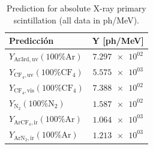 \begin{table}[h!] \centering
\caption{Prediction for absolute X-ray primary scintillation (all data in ph/MeV).}
\label{tab:prediction}
\begin{tabular}{lS}
\toprule
{Predicción} & {Y [ph/MeV]} \\
\midrule
$Y_{\mathrm{Ar3rd,uv}} (100\% \mathrm{Ar})$ & $\num{7.297e+02}$ \\
$Y_{\mathrm{CF_4,uv}} (100\% \mathrm{CF_4})$ & $\num{5.575e+03}$ \\
$Y_{\mathrm{CF_4,vis}} (100\% \mathrm{CF_4})$ & $\num{7.388e+02}$ \\
$Y_{\mathrm{N_2}} (100\% \mathrm{N_2})$ & $\num{1.587e+02}$ \\
$Y_{\mathrm{ArCF_4,ir}} (100\% \mathrm{Ar})$ & $\num{1.064e+03}$ \\
$Y_{\mathrm{ArN_2,ir}} (100\% \mathrm{Ar})$ & $\num{1.213e+03}$ \\
\bottomrule
\end{tabular}
\end{table}
